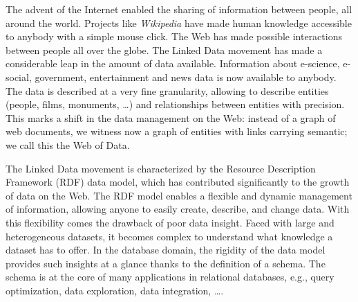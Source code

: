 %
%

The advent of the Internet enabled the sharing of information between people, all around the world. Projects like \emph{Wikipedia} have made human knowledge accessible to anybody with a simple mouse click. The Web has made possible interactions between people all over the globe. The Linked Data movement has made a considerable leap in the amount of data available. Information about e-science, e-social, government, entertainment and news data is now available to anybody. The data is described at a very fine granularity, allowing to describe entities (people, films, monuments, \ldots) and relationships between entities with precision. This marks a shift in the data management on the Web: instead of a graph of web documents, we witness now a graph of entities with links carrying semantic; we call this the Web of Data.

The Linked Data movement is characterized by the Resource Description Framework (RDF) data model, which has contributed significantly to the growth of data on the Web. The RDF model enables a flexible and dynamic management of information, allowing anyone to easily create, describe, and change data. With this flexibility comes the drawback of poor data insight. Faced with large and heterogeneous datasets, it becomes complex to understand what knowledge a dataset has to offer. In the database domain, the rigidity of the data model provides such insights at a glance thanks to the definition of a schema. The schema is at the core of many applications in relational databases, e.g., query optimization, data exploration, data integration, \ldots .

